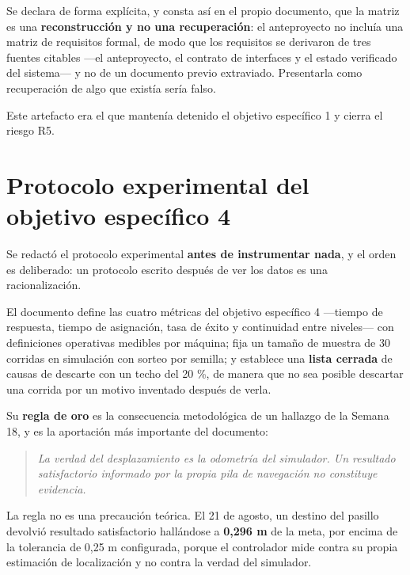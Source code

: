 \documentclass[12pt,letterpaper]{article}
\begin{document}
Se declara de forma explícita, y consta así en el propio documento, que la matriz es una \textbf{reconstrucción y no una recuperación}: el anteproyecto no incluía una matriz de requisitos formal, de modo que los requisitos se derivaron de tres fuentes citables ---el anteproyecto, el contrato de interfaces y el estado verificado del sistema--- y no de un documento previo extraviado. Presentarla como recuperación de algo que existía sería falso.

Este artefacto era el que mantenía detenido el objetivo específico 1 y cierra el riesgo R5.

\section{Protocolo experimental del objetivo específico 4}
\label{sec:protocolo}

Se redactó el protocolo experimental \textbf{antes de instrumentar nada}, y el orden es deliberado: un protocolo escrito después de ver los datos es una racionalización.

El documento define las cuatro métricas del objetivo específico 4 ---tiempo de respuesta, tiempo de asignación, tasa de éxito y continuidad entre niveles--- con definiciones operativas medibles por máquina; fija un tamaño de muestra de 30 corridas en simulación con sorteo por semilla; y establece una \textbf{lista cerrada} de causas de descarte con un techo del 20 \%, de manera que no sea posible descartar una corrida por un motivo inventado después de verla.

Su \textbf{regla de oro} es la consecuencia metodológica de un hallazgo de la Semana 18, y es la aportación más importante del documento:

\begin{quote}
\textit{La verdad del desplazamiento es la odometría del simulador. Un resultado satisfactorio informado por la propia pila de navegación no constituye evidencia.}
\end{quote}

La regla no es una precaución teórica. El 21 de agosto, un destino del pasillo devolvió resultado satisfactorio hallándose a \textbf{0,296 m} de la meta, por encima de la tolerancia de 0,25 m configurada, porque el controlador mide contra su propia estimación de localización y no contra la verdad del simulador.
\end{document}
